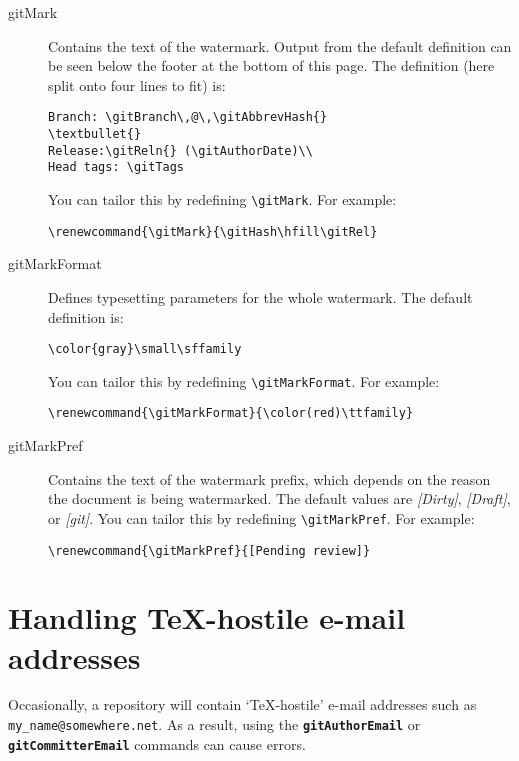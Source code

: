 \documentclass[a4paper,12pt,twoside,openany]{memoir}
\newcommand{\dark}[1]{\texttt\textbf{{#1}}}
\newcommand{\sfit}[1]{\textit{#1}}
\begin{document}
\begin{description}

\item[gitMark]
    Contains the text of the watermark.
    Output from the default definition can be seen
    below the footer
    at the bottom of this page.
    The definition
    (here split onto four lines to fit)
    is:

\begin{verbatim}
Branch: \gitBranch\,@\,\gitAbbrevHash{}
\textbullet{}
Release:\gitReln{} (\gitAuthorDate)\\
Head tags: \gitTags
\end{verbatim}
You can tailor this by redefining \verb!\gitMark!.
For example:

\begin{verbatim}
\renewcommand{\gitMark}{\gitHash\hfill\gitRel}
\end{verbatim}

\item[gitMarkFormat]
    Defines typesetting parameters for the whole watermark.
    The default definition is:

\begin{verbatim}
\color{gray}\small\sffamily
\end{verbatim}
You can tailor this by redefining \verb!\gitMarkFormat!. For example:

\begin{verbatim}
\renewcommand{\gitMarkFormat}{\color(red)\ttfamily}
\end{verbatim}

\item[gitMarkPref]
    Contains the text of the watermark prefix,
    which depends on the reason the document is being watermarked.
    The default values are \sfit{[Dirty]}, \sfit{[Draft]}, or \sfit{[git]}.
    You can tailor this by redefining \verb!\gitMarkPref!. For example:

\begin{verbatim}
\renewcommand{\gitMarkPref}{[Pending review]}
\end{verbatim}

\end{description}

\clearpage
\section{Handling \TeX-hostile e-mail addresses}
\label{sect:emailuser}
Occasionally, a repository will contain `\TeX-hostile'
e-mail addresses such as \verb!my_name@somewhere.net!.
As a result, using the \dark{gitAuthorEmail}
or \dark{gitCommitterEmail} commands can cause errors.
\end{document}
